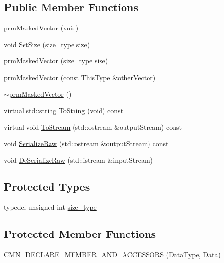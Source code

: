 \subsection*{Public Member Functions}
\begin{DoxyCompactItemize}
\item 
\hyperlink{classprm_masked_vector_ada7aa5c53340ac59a4531d2b4964689c}{prm\-Masked\-Vector} (void)
\item 
void \hyperlink{classprm_masked_vector_a4a77f03b68057a6d0b14d3203f5997e7}{Set\-Size} (\hyperlink{classprm_masked_vector_af5110e0749d68ef7b7424a11d746b964}{size\-\_\-type} size)
\item 
\hyperlink{classprm_masked_vector_a46ced5abe7ba852a5af6f0ed0d8b6d52}{prm\-Masked\-Vector} (\hyperlink{classprm_masked_vector_af5110e0749d68ef7b7424a11d746b964}{size\-\_\-type} size)
\item 
\hyperlink{classprm_masked_vector_ade8f33a543fc09f8f8be8da593cabe96}{prm\-Masked\-Vector} (const \hyperlink{classprm_masked_vector_aaa6c739a3050e8d46d9a7234ed4edc69}{This\-Type} \&other\-Vector)
\item 
\hyperlink{classprm_masked_vector_a3b1157749b45de893b174e20634167ef}{$\sim$prm\-Masked\-Vector} ()
\item 
virtual std\-::string \hyperlink{classprm_masked_vector_aa07ac569137cf382fa4fb0b9322254c1}{To\-String} (void) const 
\item 
virtual void \hyperlink{classprm_masked_vector_a9e470ac2eec3971ad0865bdacce96097}{To\-Stream} (std\-::ostream \&output\-Stream) const 
\item 
void \hyperlink{classprm_masked_vector_a15ca5ad95407f9ffca4a020d275bcaa2}{Serialize\-Raw} (std\-::ostream \&output\-Stream) const 
\item 
void \hyperlink{classprm_masked_vector_a8513f8bf845fb2f4c77c04c31ad301b5}{De\-Serialize\-Raw} (std\-::istream \&input\-Stream)
\end{DoxyCompactItemize}
\subsection*{Protected Types}
\begin{DoxyCompactItemize}
\item 
typedef unsigned int \hyperlink{classprm_masked_vector_af5110e0749d68ef7b7424a11d746b964}{size\-\_\-type}
\end{DoxyCompactItemize}
\subsection*{Protected Member Functions}
{\bf }\par
\begin{DoxyCompactItemize}
\item 
\hyperlink{classprm_masked_vector_a751b1ea008184ee4dd4d06b846a1386c}{C\-M\-N\-\_\-\-D\-E\-C\-L\-A\-R\-E\-\_\-\-M\-E\-M\-B\-E\-R\-\_\-\-A\-N\-D\-\_\-\-A\-C\-C\-E\-S\-S\-O\-R\-S} (\hyperlink{classprm_masked_vector_a7699da34296337db788196d01482defb}{Data\-Type}, Data)
\end{DoxyCompactItemize}

